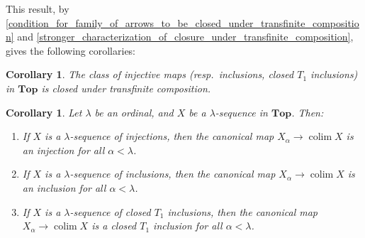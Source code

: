 \documentclass{amsart}
\theoremstyle{plain}
\newtheorem{corollary}[theorem]{Corollary}
\theoremstyle{definition}
\newcommand{\Top}{\mbf{Top}}
\newcommand{\0}{\mathbf{0}}
\newcommand{\mbf}[1]{\mathbf{#1}}
\renewcommand{\(}{\left(}
\renewcommand{\)}{\right)}
\DeclareMathOperator*{\colim}{colim}
\begin{document}
This result, by \autoref{condition_for_family_of_arrows_to_be_closed_under_transfinite_composition} and \autoref{stronger_characterization_of_closure_under_transfinite_composition}, gives the following corollaries:

\begin{corollary}\label{inclusions_closed_under_transfinite_composition}
  The class of injective maps (resp.\ inclusions, closed $T_1$ inclusions) in $\Top$ is closed under transfinite composition.
\end{corollary}

\begin{corollary}\label{colimit_legs_of_lambda_sequence_of_inclusions_are_inclusions}
  Let $\lambda$ be an ordinal, and $X$ be a $\lambda$-sequence in $\Top$. 
  Then:
  \begin{enumerate}[label=(\roman*),noitemsep]
    \item If $X$ is a $\lambda$-sequence of injections, then the canonical map $X_\alpha\to\colim X$ is an injection for all $\alpha<\lambda$.
    \item If $X$ is a $\lambda$-sequence of inclusions, then the canonical map $X_\alpha\to\colim X$ is an inclusion for all $\alpha<\lambda$.
    \item If $X$ is a $\lambda$-sequence of closed $T_1$ inclusions, then the canonical map $X_\alpha\to\colim X$ is a closed $T_1$ inclusion for all $\alpha<\lambda$.
  \end{enumerate} 
\end{corollary}
\end{document}
